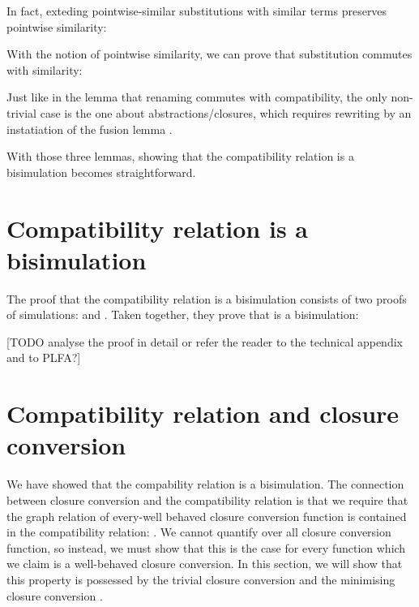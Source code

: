 \documentclass[bsc,frontabs,oneside,singlespacing,parskip,deptreport]{infthesis}
\theoremstyle{definition}
\theoremstyle{lemma}
\begin{document}
In fact, exteding pointwise-similar substitutions with similar terms 
preserves pointwise similarity:


With the notion of pointwise similarity, we can prove that
substitution commutes with similarity:


Just like in the lemma that renaming commutes with compatibility, the
only non-trivial case is the one about abstractions/closures, which
requires rewriting by an instatiation of the fusion lemma
.


With those three lemmas, showing that the compatibility relation is a
bisimulation becomes straightforward.

\section{Compatibility relation is a bisimulation}
\label{sec:comp-relat-bisim}

The proof that the compatibility relation \AS{\ti} is a bisimulation
consists of two proofs of simulations:  and . Taken together,
they prove that \AS{\ti} is a bisimulation:


[TODO analyse the proof in detail or refer the reader to the technical
appendix and to PLFA?]

\section{Compatibility relation and closure conversion}
\label{sec:comp-relat-clos}

We have showed that the compability relation is a bisimulation. The
connection between closure conversion and the compatibility relation
is that we require that the graph relation of every-well behaved
closure conversion function  is contained in the compatibility
relation: . We cannot quantify over all closure conversion function, so
instead, we must show that this is the case for every function which
we claim is a well-behaved closure conversion. In this section, we
will show that this property is possessed by the trivial closure
conversion  and the minimising closure conversion
.
\end{document}
